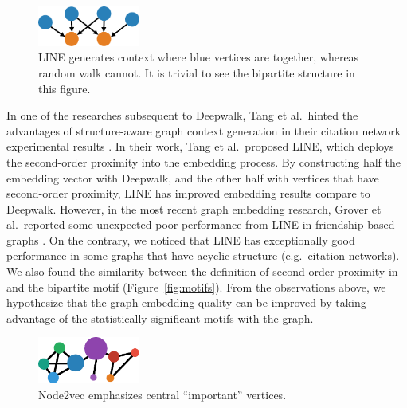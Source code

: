 \documentclass[letterpaper]{article}
\begin{document}
            \begin{figure}
                \centering
                \includegraphics[width=0.3\textwidth]{fig3_line}
                \caption{LINE generates context where blue vertices are together, whereas random walk cannot.
                It is trivial to see the bipartite structure in this figure.}
                \label{fig:line}
            \end{figure}

            In one of the researches subsequent to Deepwalk, Tang et al.\ hinted the advantages 
            of structure-aware graph context generation in their citation network experimental 
            results \cite{line}. In their work, Tang et al.\ proposed LINE, which deploys the
            second-order proximity into the embedding process. By constructing half the embedding
            vector with Deepwalk, and the other half with vertices that have second-order proximity,
            LINE has improved embedding results compare to Deepwalk. However, in the most recent
            graph embedding research, Grover et al.\ reported some unexpected poor performance
            from LINE in friendship-based graphs \cite{node2vec}. On the contrary, we noticed that 
            LINE has exceptionally good performance in some graphs that have acyclic structure 
            (e.g.\ citation networks). We also found the similarity between the definition of 
            second-order proximity in \cite{line} and the bipartite motif (Figure~\ref{fig:motifs}).
            From the observations above, we hypothesize that the graph embedding quality can be
            improved by taking advantage of the statistically significant motifs with the graph.

            \begin{figure}
                \centering
                \includegraphics[width=0.3\textwidth]{fig4_n2v}
                \caption{Node2vec emphasizes central ``important'' vertices.}
                \label{fig:n2v}
            \end{figure}
\end{document}
